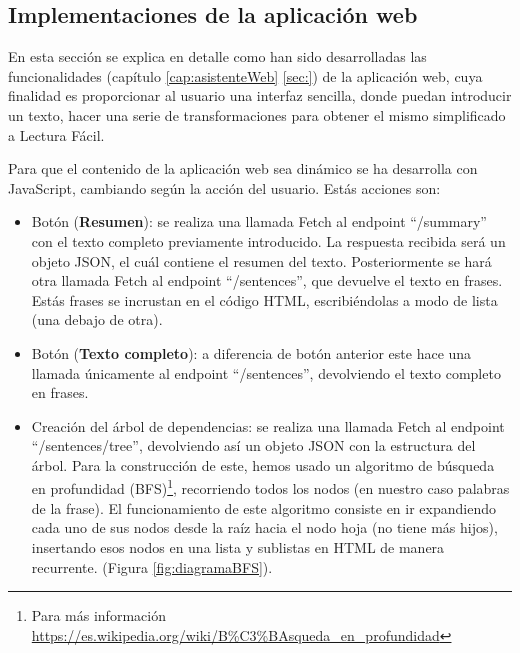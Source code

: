 \subsection{Implementaciones de la aplicación web}

En esta sección se explica en detalle como han sido desarrolladas las funcionalidades (capítulo \ref{cap:asistenteWeb} \ref{sec:}) de la aplicación web, cuya finalidad es proporcionar al usuario una interfaz sencilla, donde puedan introducir un texto, hacer una serie de transformaciones para obtener el mismo simplificado a Lectura Fácil.


Para que el contenido de la aplicación web sea dinámico se ha desarrolla con JavaScript, cambiando según la acción del usuario. Estás acciones son:

\begin{itemize}
	\item Botón (\textbf{Resumen}): se realiza una llamada Fetch al endpoint ``/summary'' con el texto completo previamente introducido. La respuesta recibida será un objeto JSON, el cuál contiene el resumen del texto. Posteriormente se hará otra llamada Fetch al endpoint ``/sentences'', que devuelve el texto en frases. Estás frases se incrustan en el código HTML, escribiéndolas a modo de lista (una debajo de otra).    
 
	\item Botón (\textbf{Texto completo}): a diferencia de botón anterior este hace una llamada únicamente al endpoint ``/sentences'', devolviendo el texto completo en frases.

	\item Creación del árbol de dependencias: se realiza una llamada Fetch al endpoint ``/sentences/tree'', devolviendo así un objeto JSON con la estructura del árbol. Para la construcción de este, hemos usado un algoritmo de búsqueda en profundidad (BFS)\footnote{Para más información  \href{https://es.wikipedia.org/wiki/B\%C3\%BAsqueda\_en\_profundidad}{https://es.wikipedia.org/wiki/B\%C3\%BAsqueda\_en\_profundidad}}, recorriendo todos los nodos (en nuestro caso palabras de la frase). El funcionamiento de este algoritmo consiste en ir expandiendo cada uno de sus nodos desde la raíz hacia el nodo hoja (no tiene más hijos), insertando esos nodos en una lista y sublistas en HTML de manera recurrente. (Figura \ref{fig:diagramaBFS}).
	\begin{figure}[h!]
		\centering
		

\end{figure}
\end{itemize}
